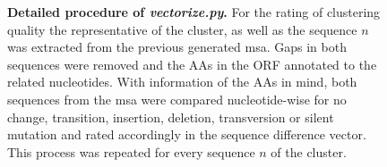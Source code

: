     \begin{figure}[!htb]
        \centering
        \caption[Detailed procedure of \textit{vectorize.py}]{\textbf{Detailed procedure of \textit{vectorize.py}.} For the rating of clustering quality %
        the representative of the cluster, as well as the sequence $n$ was extracted from the previous generated \gls{msa}. Gaps in both sequences were removed and the \glspl{AA} in the {ORF} annotated to the related nucleotides. With information of the \glspl{AA} in mind, both sequences from the \gls{msa} were compared nucleotide-wise for no change, transition, insertion, deletion, transversion or silent mutation and rated accordingly in the sequence difference vector. This process was repeated for every sequence $n$ of the cluster.}
        \label{fig:3.2}
    \end{figure}
    
